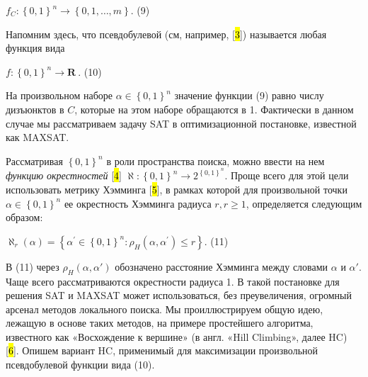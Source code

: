 $f_{C} \colon \left\{ 0,1 \right\}^{n} \to \left\{ 0,1,\ldots,m \right\}$. (9)

Напомним здесь, что псевдобулевой (см, например, {[}\hl{3}{]}) называется любая функция вида

$f \colon \left\{ 0,1 \right\}^{n} \to \mathbf{R}\ .$ (10)

На произвольном наборе $\alpha \in \left\{ 0,1 \right\}^{n}$ значение функции (9) равно числу дизъюнктов в $C$, которые на этом наборе обращаются в 1. Фактически в данном случае мы рассматриваем задачу SAT в оптимизационной постановке, известной как MAXSAT.

Рассматривая $\left\{ 0,1 \right\}^{n}$ в роли пространства поиска, можно ввести на нем \textit{функцию окрестностей} {[}\hl{4}{]} $\aleph:\left\{ 0,1 \right\}^{n} \to 2^{\left\{ 0,1 \right\}^{n}}$. Проще всего для этой цели использовать метрику Хэмминга {[}\hl{5}{]}, в рамках которой для произвольной точки $\alpha \in \left\{ 0,1 \right\}^{n}$ ее окрестность Хэмминга радиуса $r,r \geq 1$, определяется следующим образом:

$\aleph_{r}(\alpha) = \left\{ \alpha^{'} \in \left\{ 0,1 \right\}^{n}:\rho_{H}\left( \alpha,\alpha^{'} \right) \leq r \right\}$. (11)

В (11) через $\rho_{H}(\alpha,\alpha')$ обозначено расстояние Хэмминга между словами $\alpha$ и $\alpha'$. Чаще всего рассматриваются окрестности радиуса 1. В такой постановке для решения SAT и MAXSAT может использоваться, без преувеличения, огромный арсенал методов локального поиска. Мы проиллюстрируем общую идею, лежащую в основе таких методов, на примере простейшего алгоритма, известного как «Восхождение к вершине» (в англ. «Hill Climbing», далее HC) {[}\hl{6}{]}. Опишем вариант HC, применимый для максимизации произвольной псевдобулевой функции вида (10).

